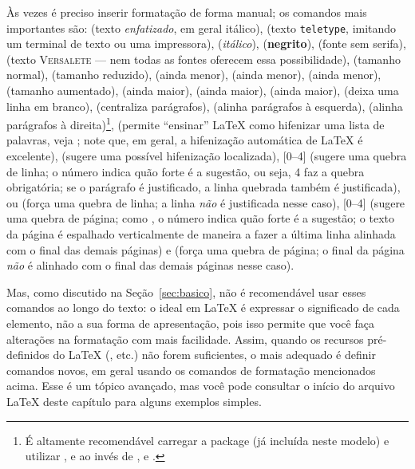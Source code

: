 Às vezes é preciso inserir formatação de forma manual; os comandos mais
importantes são:
 (texto \emph{enfatizado}, em geral itálico),
 (texto \texttt{teletype}, imitando um
terminal de texto ou uma impressora),
 (\textit{itálico}),
 (\textbf{negrito}),
 (fonte \textsf{sem serifa}),
 (texto \textsc{Versalete} --- nem todas
as fontes oferecem essa possibilidade),
 (tamanho normal),
 (tamanho reduzido),
 (ainda menor),
 (ainda menor),
 (ainda menor),
 (tamanho aumentado),
 (ainda maior),
 (ainda maior),
 (ainda maior),
 (deixa uma linha em branco),
 (centraliza parágrafos),
 (alinha parágrafos à esquerda),
 (alinha parágrafos à direita)\footnote{É
altamente recomendável carregar a package  (já incluída
neste modelo) e utilizar ,  e
 ao invés de , 
e .},
 (permite ``ensinar'' \LaTeX{} como hifenizar
uma lista de palavras, veja ; note que, em geral, a
hifenização automática de \LaTeX{} é excelente),
\ltxcmd{-} (sugere uma possível hifenização localizada),
[0--4] (sugere uma quebra de linha; o número indica
quão forte é a sugestão, ou seja, 4 faz a quebra obrigatória; se o
parágrafo é justificado, a linha quebrada também é justificada),
 ou \cmd{\sla\sla} (força uma quebra de linha; a
linha \emph{não} é justificada nesse caso),
[0--4] (sugere uma quebra de página; como
, o número indica quão forte é a sugestão; o texto
da página é espalhado verticalmente de maneira a fazer a última linha
alinhada com o final das demais páginas) e
 (força uma quebra de página; o final da página
\emph{não} é alinhado com o final das demais páginas nesse caso).

Mas, como discutido na Seção~\ref{sec:basico}, não é recomendável
usar esses comandos ao longo do texto: o ideal em \LaTeX{} é expressar
o significado de cada elemento, não a sua forma de apresentação,
pois isso permite que você faça alterações na formatação com mais
facilidade. Assim, quando os recursos pré-definidos do \LaTeX{}
(,  etc.) não forem suficientes,
o mais adequado é definir comandos novos, em geral usando os comandos
de formatação mencionados acima. Esse é um tópico avançado, mas você
pode consultar o início do arquivo \LaTeX{} deste capítulo para alguns
exemplos simples.

